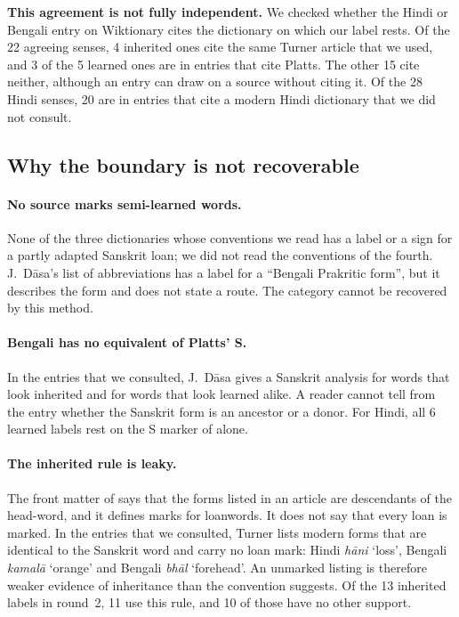 \documentclass[11pt]{article}
\newcommand{\gl}[1]{`#1'}
\begin{document}
\textbf{This agreement is not fully independent.} We checked whether the Hindi or Bengali entry on Wiktionary cites the dictionary on which our label rests. Of the 22 agreeing senses, 4 inherited ones cite the same Turner article that we used, and 3 of the 5 learned ones are in entries that cite Platts. The other 15 cite neither, although an entry can draw on a source without citing it. Of the 28 Hindi senses, 20 are in entries that cite a modern Hindi dictionary that we did not consult.

\subsection{Why the boundary is not recoverable}

\paragraph{No source marks semi-learned words.} None of the three dictionaries whose conventions we read has a label or a sign for a partly adapted Sanskrit loan; we did not read the conventions of the fourth. J.~D\=asa's list of abbreviations has a label for a ``Bengali Prakritic form'', but it describes the form and does not state a route. The category cannot be recovered by this method.

\paragraph{Bengali has no equivalent of Platts' S.} In the entries that we consulted, J.~D\=asa gives a Sanskrit analysis for words that look inherited and for words that look learned alike. A reader cannot tell from the entry whether the Sanskrit form is an ancestor or a donor. For Hindi, all 6 learned labels rest on the S marker of \citet{platts1884} alone.

\paragraph{The inherited rule is leaky.} The front matter of \citet{turner1966cdial} says that the forms listed in an article are descendants of the head-word, and it defines marks for loanwords. It does not say that every loan is marked. In the entries that we consulted, Turner lists modern forms that are identical to the Sanskrit word and carry no loan mark: Hindi \textit{h\=ani} \gl{loss}, Bengali \textit{kamal\=a} \gl{orange} and Bengali \textit{bh\=al} \gl{forehead}. An unmarked listing is therefore weaker evidence of inheritance than the convention suggests. Of the 13 inherited labels in round~2, 11 use this rule, and 10 of those have no other support.
\end{document}
